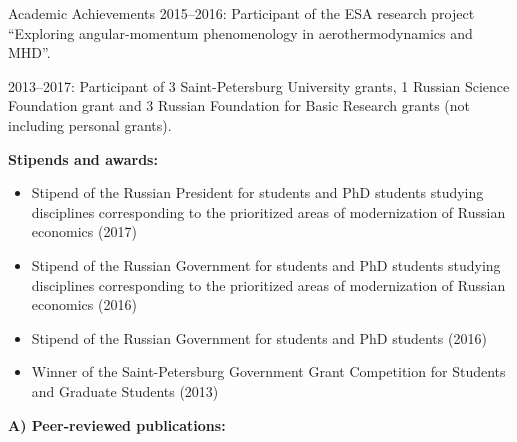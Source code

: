 \documentclass{resume} %
\begin{document}
\begin{rSection}{Academic Achievements}
2015--2016: Participant of the ESA research project ``Exploring angular-momentum phenomenology in aerothermodynamics and MHD''.

2013--2017: Participant of 3 Saint-Petersburg University grants, 1 Russian Science Foundation grant and 3 Russian Foundation for Basic Research grants (not including personal grants).

{\bf Stipends and awards:}
\begin{itemize}
    \item Stipend of the Russian President for students and PhD students studying disciplines corresponding to the prioritized areas of modernization of Russian economics (2017)
    \item Stipend of the Russian Government for students and PhD students studying disciplines corresponding to the prioritized areas of modernization of Russian economics (2016)
    \item Stipend of the Russian Government for students and PhD students (2016)
    \item Winner of the Saint-Petersburg Government Grant Competition for Students and Graduate Students (2013)
\end{itemize}
\end{rSection}

\newpage



{\bf A) Peer-reviewed publications:}
\end{document}
